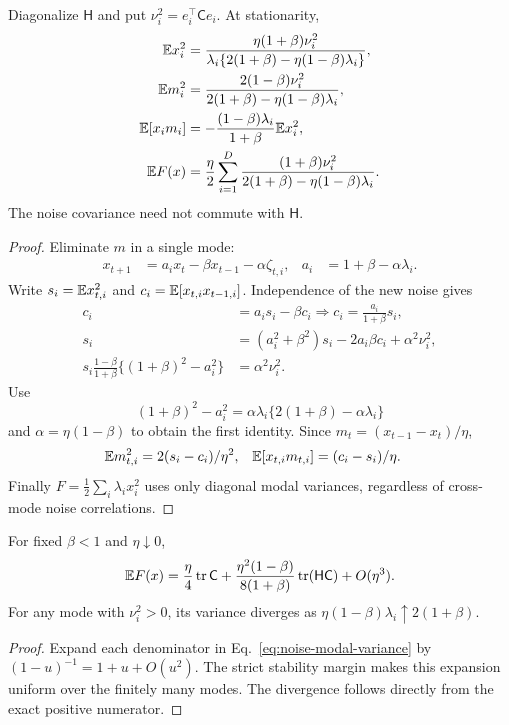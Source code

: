 \begin{theorem}
\label{thm:noise-modal-variance}
Diagonalize $\mathsf H$ and put
$\nu_i^2=e_i^\top\mathsf Ce_i$. At stationarity,
\begin{align}
\mathbb E x_i^2
&=\frac{\eta(1+\beta)\nu_i^2}
{\lambda_i\{2(1+\beta)-\eta(1-\beta)\lambda_i\}},\\
\mathbb E m_i^2
&=\frac{2(1-\beta)\nu_i^2}
{2(1+\beta)-\eta(1-\beta)\lambda_i},\\
\mathbb E[x_im_i]
&=-\frac{(1-\beta)\lambda_i}{1+\beta}\mathbb E x_i^2,\\
\mathbb E F(x)
&=\frac{\eta}{2}\sum_{i=1}^D
\frac{(1+\beta)\nu_i^2}
{2(1+\beta)-\eta(1-\beta)\lambda_i}.
\label{eq:noise-modal-variance}
\end{align}
The noise covariance need not commute with $\mathsf H$.
\end{theorem}
\begin{proof}
Eliminate $m$ in a single mode:
\begin{align}
x_{t+1}&=a_ix_t-\beta x_{t-1}-\alpha\zeta_{t,i},&
a_i&=1+\beta-\alpha\lambda_i .
\end{align}
Write $s_i=\mathbb E x_{t,i}^2$ and $c_i=\mathbb E[x_{t,i}x_{t-1,i}]$.
Independence of the new noise gives
\begin{align}
c_i&=a_is_i-\beta c_i
\Longrightarrow c_i=\frac{a_i}{1+\beta}s_i,\\
s_i&=(a_i^2+\beta^2)s_i-2a_i\beta c_i+\alpha^2\nu_i^2,\\
s_i\frac{1-\beta}{1+\beta}
\{(1+\beta)^2-a_i^2\}&=\alpha^2\nu_i^2 .
\end{align}
Use
\begin{equation}
(1+\beta)^2-a_i^2
=\alpha\lambda_i\{2(1+\beta)-\alpha\lambda_i\}
\end{equation}
and $\alpha=\eta(1-\beta)$ to obtain the first identity.
Since $m_t=(x_{t-1}-x_t)/\eta$,
\begin{align}
\mathbb E m_{t,i}^2&=2(s_i-c_i)/\eta^2,&
\mathbb E[x_{t,i}m_{t,i}]&=(c_i-s_i)/\eta .
\end{align}
Finally $F=\frac12\sum_i\lambda_i x_i^2$ uses only diagonal modal
variances, regardless of cross-mode noise correlations.
\end{proof}

\begin{corollary}
For fixed $\beta<1$ and $\eta\downarrow0$,
\begin{equation}
\mathbb E F(x)
=\frac{\eta}{4}\operatorname{tr}\mathsf C
+\frac{\eta^2(1-\beta)}{8(1+\beta)}
\operatorname{tr}(\mathsf H\mathsf C)+O(\eta^3).
\label{eq:noise-small-step}
\end{equation}
For any mode with $\nu_i^2>0$, its variance diverges as
$\eta(1-\beta)\lambda_i\uparrow2(1+\beta)$.
\end{corollary}
\begin{proof}
Expand each denominator in Eq.~\eqref{eq:noise-modal-variance} by
$(1-u)^{-1}=1+u+O(u^2)$. The strict stability margin makes this
expansion uniform over the finitely many modes.
The divergence follows directly from the exact positive numerator.
\end{proof}


